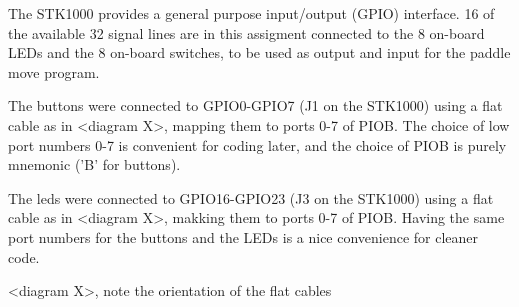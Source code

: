 The STK1000 provides a general purpose input/output (GPIO) interface.
16 of the available 32 signal lines are in this assigment connected to the 8 on-board LEDs and the 8 on-board switches, to be used as output and input for the paddle move program.

The buttons were connected to GPIO0-GPIO7 (J1 on the STK1000) using a flat cable as in <diagram X>, mapping them to ports 0-7 of PIOB.
The choice of low port numbers 0-7 is convenient for coding later, and the choice of PIOB is purely mnemonic ('B' for buttons).

The leds were connected to GPIO16-GPIO23 (J3 on the STK1000) using a flat cable as in <diagram X>, makking them to ports 0-7 of PIOB.
Having the same port numbers for the buttons and the LEDs is a nice convenience for cleaner code.


<diagram X>, note the orientation of the flat cables
